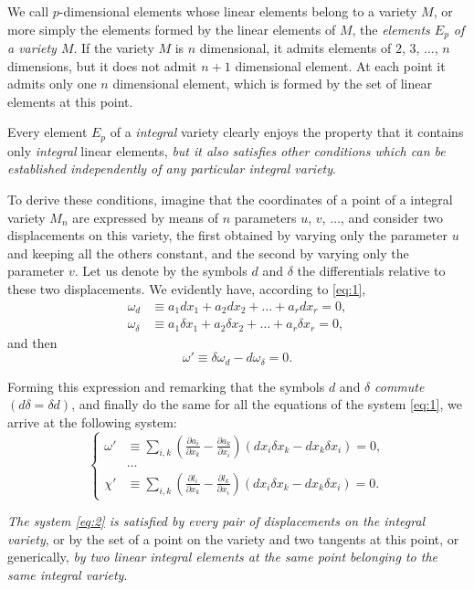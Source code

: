 \documentclass[leqno,11pt]{book}
\newcommand{\pd}{\partial}
\theoremstyle{shape1}
\theoremstyle{shapesmall}
\begin{document}
We call $p$-dimensional elements whose linear elements belong to a variety $M$, or more simply the elements formed by the linear elements of $M$, the \emph{elements $E_{p}$ of a variety $M$}. If the variety $M$ is $n$ dimensional, it admits elements of $2$, $3$, $\dots$, $n$ dimensions, but it does not admit $n+1$ dimensional element. At each point it admits only one $n$ dimensional element, which is formed by the set of linear elements at this point.

Every element $E_{p}$ of a \emph{integral} variety clearly enjoys the property that it contains only \emph{integral} linear elements, \emph{but it also satisfies other conditions which can be established independently of any particular integral variety}.

To derive these conditions, imagine that the coordinates of a point of a integral variety $M_{n}$ are expressed by means of $n$ parameters $u$, $v$, $\dots$, and consider two displacements on this variety, the first obtained by varying only the parameter $u$ and keeping all the others constant, and the second by varying only the parameter $v$. Let us denote by the symbols $d$ and $\delta$ the differentials relative to these two displacements. We evidently have, according to \eqref{eq:1},
\begin{align*}
  \omega_{d}&\equiv a_{1}dx_{1}+a_{2}dx_{2}+\dots+a_{r}dx_{r}=0,\\
  \omega_{\delta}&\equiv a_{1}\delta x_{1}+a_{2}\delta x_{2}+\dots+a_{r}\delta x_{r}=0,
\end{align*}
and then
\[
\omega'\equiv\delta\omega_{d}-d\omega_{\delta}=0.
\]

Forming this expression and remarking that the symbols $d$ and $\delta$ \emph{commute} $(d\delta=\delta d)$, and finally do the same for all the equations of the system \eqref{eq:1}, we arrive at the following system:
\begin{equation}
  \label{eq:2}
  \left\{
    \begin{aligned}
      \omega'&\equiv\sum_{i,k}\left(\frac{\pd a_{i}}{\pd x_{k}}-\frac{\pd a_{k}}{\pd x_{i}}\right)(dx_{i}\delta x_{k}-dx_{k}\delta x_{i})=0,\\
      &\dots\\
      \chi'&\equiv\sum_{i,k}\left(\frac{\pd l_{i}}{\pd x_{k}}-\frac{\pd l_{k}}{\pd x_{i}}\right)(dx_{i}\delta x_{k}-dx_{k}\delta x_{i})=0.
    \end{aligned}
  \right.
\end{equation}

\emph{The system \eqref{eq:2} is satisfied by every pair of displacements on the integral variety}, or by the set of a point on the variety and two tangents at this point, or generically, \emph{by two linear integral elements at the same point belonging to the same integral variety}.
\end{document}
